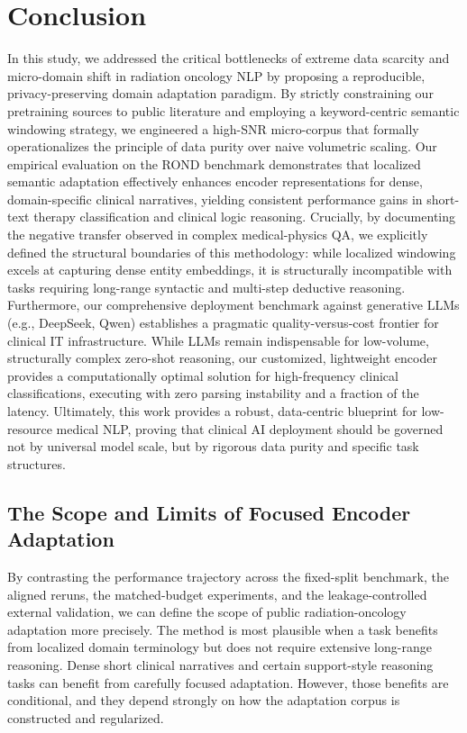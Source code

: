 \documentclass[a4paper,fleqn]{cas-dc}
\begin{document}
\section{Conclusion} \label{conclusion and future work}
In this study, we addressed the critical bottlenecks of extreme data scarcity and micro-domain shift in radiation oncology NLP by proposing a reproducible, privacy-preserving domain adaptation paradigm. By strictly constraining our pretraining sources to public literature and employing a keyword-centric semantic windowing strategy, we engineered a high-SNR micro-corpus that formally operationalizes the principle of data purity over naive volumetric scaling. Our empirical evaluation on the ROND benchmark demonstrates that localized semantic adaptation effectively enhances encoder representations for dense, domain-specific clinical narratives, yielding consistent performance gains in short-text therapy classification and clinical logic reasoning. Crucially, by documenting the negative transfer observed in complex medical-physics QA, we explicitly defined the structural boundaries of this methodology: while localized windowing excels at capturing dense entity embeddings, it is structurally incompatible with tasks requiring long-range syntactic and multi-step deductive reasoning. Furthermore, our comprehensive deployment benchmark against generative LLMs (e.g., DeepSeek, Qwen) establishes a pragmatic quality-versus-cost frontier for clinical IT infrastructure. While LLMs remain indispensable for low-volume, structurally complex zero-shot reasoning, our customized, lightweight encoder provides a computationally optimal solution for high-frequency clinical classifications, executing with zero parsing instability and a fraction of the latency. Ultimately, this work provides a robust, data-centric blueprint for low-resource medical NLP, proving that clinical AI deployment should be governed not by universal model scale, but by rigorous data purity and specific task structures.
\fi

\subsection{The Scope and Limits of Focused Encoder Adaptation}
By contrasting the performance trajectory across the fixed-split benchmark, the aligned reruns, the matched-budget experiments, and the leakage-controlled external validation, we can define the scope of public radiation-oncology adaptation more precisely. The method is most plausible when a task benefits from localized domain terminology but does not require extensive long-range reasoning. Dense short clinical narratives and certain support-style reasoning tasks can benefit from carefully focused adaptation. However, those benefits are conditional, and they depend strongly on how the adaptation corpus is constructed and regularized.
\end{document}
